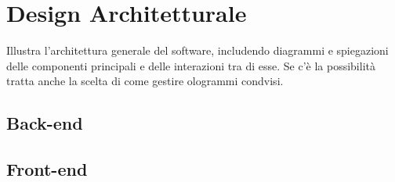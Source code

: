 \section{Design Architetturale}\label{sec:Design}
Illustra l'architettura generale del software, includendo diagrammi e spiegazioni delle componenti
principali e delle interazioni tra di esse. Se c'è la possibilità tratta anche la scelta di come gestire
ologrammi condvisi.

\subsection{Back-end}\label{ssec:BackEnd}
\subsection{Front-end}\label{ssec:FrontEnd}
\newpage